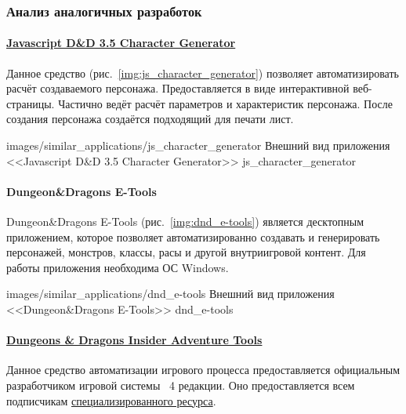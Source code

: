 \subsubsection{Анализ аналогичных разработок}


\paragraph{\href{http://www.pathguy.com/cg35.htm}{Javascript D\&D 3.5 Character Generator}}
Данное средство (рис.~\ref{img:js_character_generator}) позволяет автоматизировать расчёт создаваемого персонажа. Предоставляется в виде интерактивной веб-страницы. Частично ведёт расчёт параметров и характеристик персонажа. После создания персонажа создаётся подходящий для печати лист.

            {images/similar_applications/js_character_generator}
            {Внешний вид приложения <<Javascript D\&D 3.5 Character Generator>>}
            {js_character_generator}


\paragraph{Dungeon\&Dragons E-Tools}
Dungeon\&Dragons E-Tools (рис.~\ref{img:dnd_e-tools}) является десктопным приложением, которое позволяет автоматизированно создавать и генерировать персонажей, монстров, классы, расы и другой внутриигровой контент. Для работы приложения необходима ОС Windows.

            {images/similar_applications/dnd_e-tools}
            {Внешний вид приложения <<Dungeon\&Dragons E-Tools>>}
            {dnd_e-tools}


\paragraph{\href{http://www.wizards.com/dnd/Tool.aspx?x=dnd/4new/tool/adventuretools}{Dungeons \& Dragons Insider Adventure Tools}}
Данное средство автоматизации игрового процесса предоставляется официальным разработчиком игровой системы \dnd\ 4 редакции. Оно предоставляется всем подписчикам \href{http://www.wizards.com/dnd}{специализированного ресурса}.

